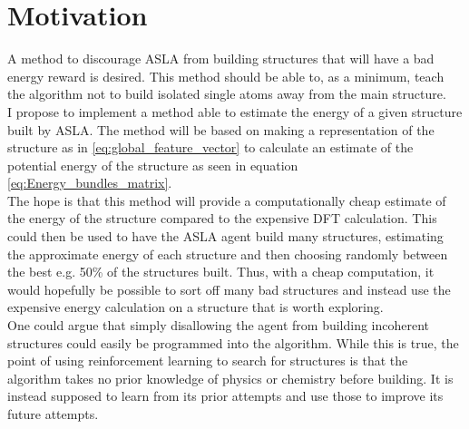 \chapter{Motivation}

A method to discourage ASLA from building structures that will have a bad energy reward is desired. This method should be able to, as a minimum, teach the algorithm not to build isolated single atoms away from the main structure. \\

I propose to implement a method able to estimate the energy of a given structure built by ASLA. The method will be based on making a representation of the structure as in \eqref{eq:global_feature_vector} to calculate an estimate of the potential energy of the structure as seen in equation \eqref{eq:Energy_bundles_matrix}. \\

The hope is that this method will provide a computationally cheap estimate of the energy of the structure compared to the expensive DFT calculation. This could then be used to have the ASLA agent build many structures, estimating the approximate energy of each structure and then choosing randomly between the best  e.g. 50\% of the structures built. Thus, with a cheap computation, it would hopefully be possible to sort off many bad structures and instead use the expensive energy calculation on a structure that is worth exploring. \\

One could argue that simply disallowing the agent from building incoherent structures could easily be programmed into the algorithm. While this is true, the point of using reinforcement learning to search for structures is that the algorithm takes no prior knowledge of physics or chemistry before building. It is instead supposed to learn from its prior attempts and use those to improve its future attempts. \\
\clearpage
